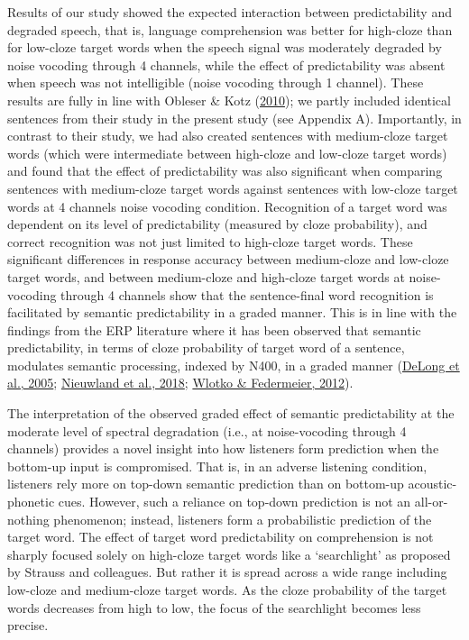 \documentclass[a4paper, nobind]{templates/ociamthesis}
\begin{document}
Results of our study showed the expected interaction between predictability and degraded speech, that is, language comprehension was better for high-cloze than for low-cloze target words when the speech signal was moderately degraded by noise vocoding through 4 channels, while the effect of predictability was absent when speech was not intelligible (noise vocoding through 1 channel).
These results are fully in line with Obleser \& Kotz (\protect\hyperlink{ref-Obleser2010}{2010});
we partly included identical sentences from their study in the present study (see Appendix A).
Importantly, in contrast to their study, we had also created sentences with medium-cloze target words (which were intermediate between high-cloze and low-cloze target words) and found that the effect of predictability was also significant when comparing sentences with medium-cloze target words against sentences with low-cloze target words at 4 channels noise vocoding condition.
Recognition of a target word was dependent on its level of predictability (measured by cloze probability), and correct recognition was not just limited to high-cloze target words.
These significant differences in response accuracy between medium-cloze and low-cloze target words, and between medium-cloze and high-cloze target words at noise-vocoding through 4 channels show that the sentence-final word recognition is facilitated by semantic predictability in a graded manner.
This is in line with the findings from the ERP literature where it has been observed that semantic predictability, in terms of cloze probability of target word of a sentence, modulates semantic processing, indexed by N400, in a graded manner (\protect\hyperlink{ref-Delong2005}{DeLong et al., 2005}; \protect\hyperlink{ref-Nieuwland2018}{Nieuwland et al., 2018}; \protect\hyperlink{ref-Wlotko2012}{Wlotko \& Federmeier, 2012}).

The interpretation of the observed graded effect of semantic predictability at the moderate level of spectral degradation (i.e., at noise-vocoding through 4 channels) provides a novel insight into how listeners form prediction when the bottom-up input is compromised.
That is, in an adverse listening condition, listeners rely more on top-down semantic prediction than on bottom-up acoustic-phonetic cues.
However, such a reliance on top-down prediction is not an all-or-nothing phenomenon; instead, listeners form a probabilistic prediction of the target word.
The effect of target word predictability on comprehension is not sharply focused solely on high-cloze target words like a `searchlight' as proposed by Strauss and colleagues.
But rather it is spread across a wide range including low-cloze and medium-cloze target words.
As the cloze probability of the target words decreases from high to low, the focus of the searchlight becomes less precise.
\end{document}

